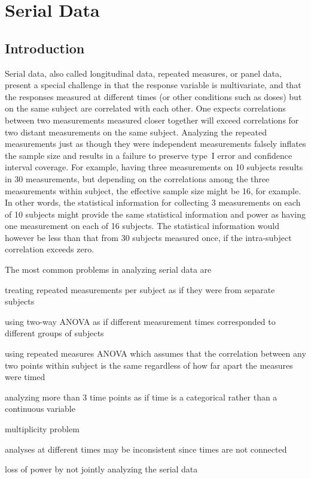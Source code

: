 

\def\apacue{1}
\chapter{Serial Data}
\section{Introduction}\ipacue
Serial data, also called longitudinal data, repeated measures, or
panel data,
present a special challenge in that the response variable is
multivariate, and that the responses measured at different times (or
other conditions such as doses) but on the same subject are correlated
with each other.  One expects correlations between two
measurements measured closer together will exceed correlations for two
distant measurements on the same subject.  Analyzing the repeated
measurements just as
though they were independent measurements falsely inflates the sample
size and results in a failure to preserve type~I error and confidence
interval coverage.  For example, having three measurements on 10
subjects results in 30 measurements, but depending on the correlations
among the three measurements within subject, the effective sample size
might be 16, for example.  In other words, the statistical information
for collecting 3 measurements on each of 10 subjects might provide the
same statistical information and power as having one measurement on
each of 16 subjects.  The statistical information would however be less than
that from 30 subjects measured once, if the intra-subject correlation
exceeds zero.

The most common problems in analyzing serial data are
\be
\item treating repeated measurements per subject as if they were from separate subjects
\item using two-way ANOVA as if different measurement times corresponded to different groups of subjects
\item using repeated measures ANOVA which assumes that the correlation between any two points within subject is the same regardless of how far apart the measures were timed
\item analyzing more than 3 time points as if time is a categorical rather than a continuous variable
 \bi
 \item multiplicity problem
 \item analyses at different times may be inconsistent since times are not connected
 \item loss of power by not jointly analyzing the serial data
 \ei
\ee


